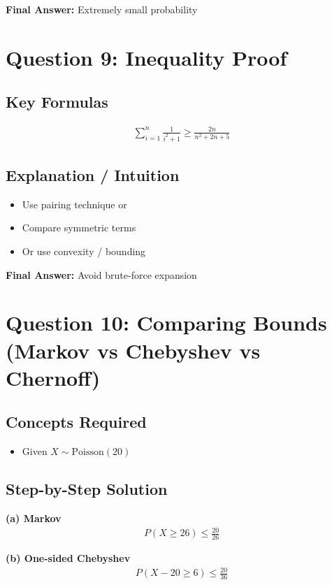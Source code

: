 \documentclass{article}
\begin{document}
\textbf{Final Answer:} Extremely small probability

\section{Question 9: Inequality Proof}

\subsection{Key Formulas}
\begin{align}
\sum_{i=1}^{n} \frac{1}{i^2 + 1} \ge \frac{2n}{n^2 + 2n + 5}
\end{align}

\subsection{Explanation / Intuition}
\begin{itemize}
\item Use pairing technique or
\item Compare symmetric terms
\item Or use convexity / bounding
\end{itemize}

\textbf{Final Answer:} Avoid brute-force expansion

\section{Question 10: Comparing Bounds (Markov vs Chebyshev vs Chernoff)}

\subsection{Concepts Required}
\begin{itemize}
\item Given $X \sim \text{Poisson}(20)$
\end{itemize}

\subsection{Step-by-Step Solution}

\textbf{(a) Markov}
\begin{align}
P(X \ge 26) \le \frac{20}{26}
\end{align}

\textbf{(b) One-sided Chebyshev}
\begin{align}
P(X - 20 \ge 6) \le \frac{20}{36}
\end{align}
\end{document}
